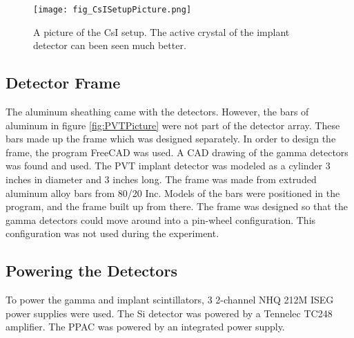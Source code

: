 \documentclass[main.tex]{subfiles}
\begin{document}
\begin{figure}
	\centerline{\texttt{[image: fig\_CsISetupPicture.png]}}
	\caption{A picture of the CsI setup.
		 The active crystal of the implant detector can been seen much better. 
		 }
	\label{fig:CsIPicture}
\end{figure}

\subsection{Detector Frame}
The aluminum sheathing came with the detectors.
However, the bars of aluminum in figure \ref{fig:PVTPicture} were not part of the detector array.
These bars made up the frame which was designed separately.
In order to design the frame, the program FreeCAD was used.
A CAD drawing of the gamma detectors was found and used.
The PVT implant detector was modeled as a cylinder 3 inches in diameter and 3 inches long.
The frame was made from extruded aluminum alloy bars from 80/20 Inc.
Models of the bars were positioned in the program, and the frame built up from there.
The frame was designed so that the gamma detectors could move around into a pin-wheel configuration.
This configuration was not used during the experiment.

\subsection{Powering the Detectors}

To power the gamma and implant scintillators, 3 2-channel NHQ 212M ISEG power supplies were used.
The Si detector was powered by a Tennelec TC248 amplifier.
The PPAC was powered by an integrated power supply.
\end{document}
